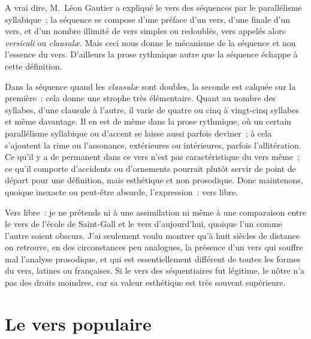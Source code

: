 \documentclass[french,twoside]{book} %
\newcommand\chapteropen{} %
\newcommand\chapterclose{} %
\begin{document}
A vrai dire, M. Léon Gautier a expliqué le vers des séquences par le parallélisme syllabique ; la séquence se compose d’une préface d’un vers, d’une finale d’un vers, et d’un nombre illimité de vers simples ou redoublés, vers appelés alors {\itshape versicali} ou {\itshape clausulæ}. Mais ceci nous donne le mécanisme de la séquence et non l’essence du vers. D’ailleurs la prose rythmique autre que la séquence échappe à cette définition.\par
Dans la séquence quand les {\itshape clausulæ} sont doubles, la seconde est calquée sur la première : cela donne une strophe très élémentaire. Quant au nombre des syllabes, d’une clausule à l’autre, il varie de quatre ou cinq à vingt-cinq syllabes et même davantage. Il en est de même dans la prose rythmique, où un certain parallélisme syllabique ou d’accent se laisse aussi parfois deviner ; à cela s’ajoutent la rime ou l’assonance, extérieures ou intérieures, parfois l’allitération. Ce qu’il y a de permanent dans ce vers n’est pas caractéristique du vers même ; ce qu’il comporte d’accidents ou d’ornements pourrait plutôt servir de point de départ pour une définition, mais esthétique et non prosodique. Donc maintenons, quoique inexacte ou peut-être absurde, l’expression : vers libre.\par
Vers libre : je ne prétends ni à une assimilation ni même à une comparaison entre le vers de l’école de Saint-Gall et le vers d’aujourd’hui, quoique l’un comme l’autre soient obscurs. J’ai seulement voulu montrer qu’à huit siècles de distance on retrouve, en des circonstances peu analogues, la présence d’un vers qui souffre mal l’analyse prosodique, et qui est essentiellement différent de toutes les formes du vers, latines ou françaises. Si le vers des séquentiaires fut légitime, le nôtre n’a pas des droits moindres, car sa valeur esthétique est très souvent supérieure.
\chapterclose


\chapteropen
\chapter[{Le vers populaire}]{Le vers populaire }\renewcommand{\leftmark}{Le vers populaire }
\end{document}

